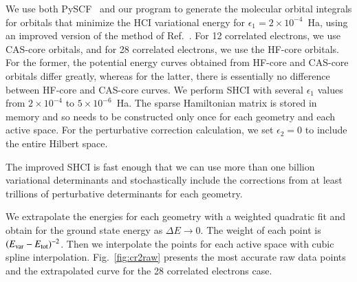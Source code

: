 We use both PySCF~\cite{SunCha_etal_PySCF-ComMolSci-18} and our program to generate the molecular orbital integrals for orbitals that minimize the HCI variational
energy for $\epsilon_1=2\times 10^{-4}$~Ha, using an improved version of the method of Ref.~\cite{SmiMusHolSha-JCTC-17}.
For 12 correlated electrons, we use CAS-core orbitals, and for 28 correlated electrons, we use the HF-core orbitals.
For the former, the potential energy curves obtained from HF-core and CAS-core orbitals differ greatly,
whereas for the latter, there is essentially no difference between HF-core and CAS-core curves.
We perform SHCI with several $\epsilon_1$ values from $2\times10^{-4}$ to $5\times10^{-6}$~Ha.
The sparse Hamiltonian matrix is stored in memory and so needs to be constructed only once for each geometry and each active space.
For the perturbative correction calculation, we set $\epsilon_2 = 0$  to include the entire Hilbert space.

The improved SHCI is fast enough that we can use more than one billion variational determinants and stochastically include the corrections from at least trillions of perturbative determinants for each geometry.

We extrapolate the energies for each geometry with a weighted quadratic fit
and obtain for the ground state energy as $\Delta E\to0$.
The weight of each point is $(E_{\rm var} - E_{\rm tot})^{-2}$.
Then we interpolate the points for each active space with cubic spline interpolation.
Fig.~\ref{fig:cr2raw} presents the most accurate raw data points and the extrapolated curve for the 28 correlated electrons case.

